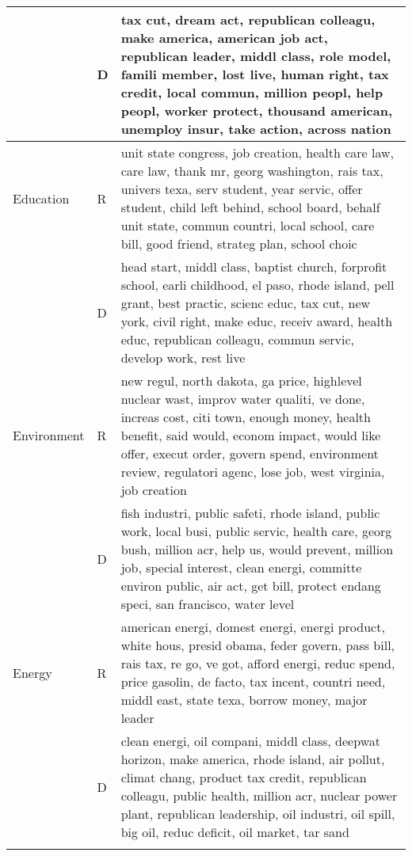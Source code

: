 \begin{longtable}{p{}p{}p{}}
   & D & tax cut, dream act, republican colleagu, make america, american job act, republican leader, middl class, role model, famili member, lost live, human right, tax credit, local commun, million peopl, help peopl, worker protect, thousand american, unemploy insur, take action, across nation \\ 
   \hline
Education & R & unit state congress, job creation, health care law, care law, thank mr, georg washington, rais tax, univers texa, serv student, year servic, offer student, child left behind, school board, behalf unit state, commun countri, local school, care bill, good friend, strateg plan, school choic \\ 
   & D & head start, middl class, baptist church, forprofit school, earli childhood, el paso, rhode island, pell grant, best practic, scienc educ, tax cut, new york, civil right, make educ, receiv award, health educ, republican colleagu, commun servic, develop work, rest live \\ 
   \hline
Environment & R & new regul, north dakota, ga price, highlevel nuclear wast, improv water qualiti, ve done, increas cost, citi town, enough money, health benefit, said would, econom impact, would like offer, execut order, govern spend, environment review, regulatori agenc, lose job, west virginia, job creation \\ 
   & D & fish industri, public safeti, rhode island, public work, local busi, public servic, health care, georg bush, million acr, help us, would prevent, million job, special interest, clean energi, committe environ public, air act, get bill, protect endang speci, san francisco, water level \\ 
   \hline
Energy & R & american energi, domest energi, energi product, white hous, presid obama, feder govern, pass bill, rais tax, re go, ve got, afford energi, reduc spend, price gasolin, de facto, tax incent, countri need, middl east, state texa, borrow money, major leader \\ 
   & D & clean energi, oil compani, middl class, deepwat horizon, make america, rhode island, air pollut, climat chang, product tax credit, republican colleagu, public health, million acr, nuclear power plant, republican leadership, oil industri, oil spill, big oil, reduc deficit, oil market, tar sand \\ 
   \hline
\hline
\label{tab:top20_slant}
\end{longtable}
\endgroup
